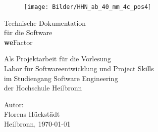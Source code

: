 %
%

\thispagestyle{empty}

\begin{figure}
\flushright						%
\texttt{[image: Bilder/HHN\_ab\_40\_mm\_4c\_pos4]}\\
\end{figure}

\vspace*{1.0cm}

\begin{center}
{\Huge Technische Dokumentation\\
\vspace{0.1cm} 
für die Software\\
\vspace{0.1cm} 
\textbf{we}Factor}

\vspace{3.0cm}

	{\Large Als Projektarbeit für die Vorlesung\\
\vspace{0.1cm}
	Labor für Softwareentwicklung und Project Skills\\
\vspace{0.1cm}
	im Studiengang Software Engineering\\
\vspace{0.1cm}
	der Hochschule Heilbronn\\

}
\end{center}

\vspace*{4.5cm}





Autor:\\
{\Large
Florens Hückstädt\\


 }
\vspace{1,5cm}
Heilbronn, \today
